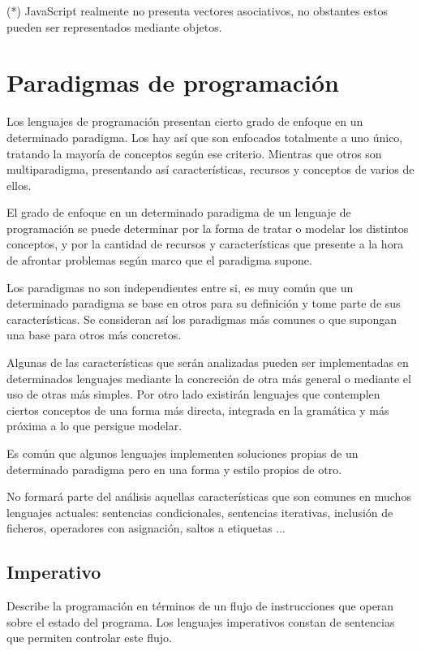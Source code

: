 (*) JavaScript realmente no presenta vectores asociativos, no obstantes estos
pueden ser representados mediante objetos. 


\section{Paradigmas de programación}

Los lenguajes de programación presentan cierto grado de enfoque en un determinado paradigma. Los hay así 
que son enfocados totalmente a uno único, tratando la mayoría de conceptos según ese criterio. Mientras 
que otros son multiparadigma, presentando  así características, recursos y conceptos de varios de ellos. 

El grado de enfoque en un determinado paradigma de un lenguaje de programación se puede determinar 
por la forma de tratar o modelar los distintos conceptos, y por la cantidad de recursos y características que 
presente a la hora de afrontar problemas según marco que el paradigma supone. 

Los paradigmas no son independientes entre si, es muy común que un determinado paradigma se 
base en otros para su definición y tome parte de sus características. Se consideran así
los paradigmas más comunes o que supongan una base para otros más concretos.

Algunas de las características que serán analizadas pueden ser 
implementadas en determinados lenguajes mediante la concreción de otra más general o mediante el uso de otras más simples. 
Por otro lado existirán lenguajes que contemplen ciertos
conceptos de una forma más directa, integrada en la gramática y más próxima a lo que persigue modelar.

Es común que algunos lenguajes implementen soluciones propias de un determinado paradigma pero en una forma y estilo
propios de otro.


No formará parte del análisis aquellas características que
son comunes en muchos lenguajes actuales: sentencias condicionales, sentencias iterativas, inclusión de ficheros, operadores con
asignación, saltos a etiquetas ...

\subsection {Imperativo}
Describe la programación en términos de un flujo de instrucciones que operan sobre el estado del programa. Los lenguajes
imperativos constan de sentencias que permiten controlar este flujo.

